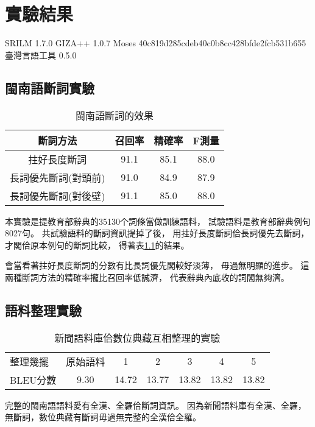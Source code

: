 
\chapter{實驗結果}
\label{章：實驗結果}
SRILM 1.7.0
GIZA++ 1.0.7
Moses 40c819d285cdeb40c0b8cc428bfde2fcb531b655
臺灣言語工具 0.5.0


\section{閩南語斷詞實驗}
\label{節：閩南語斷詞實驗}

\begin{table}
\caption{閩南語斷詞的效果}
\label{表：閩南語斷詞的效果}
\centering
\begin{tabular}{c|ccc}
斷詞方法 & 召回率 & 精確率 & F測量\\
\hline
拄好長度斷詞 & 91.1 & 85.1 & 88.0\\
長詞優先斷詞(對頭前) & 91.0 & 84.9 & 87.9\\
長詞優先斷詞(對後壁) & 91.1 & 85.0 & 88.0\\
\end{tabular}
\end{table}

本實驗是提教育部辭典的35130个詞條當做訓練語料，
試驗語料是教育部辭典例句8027句。
共試驗語料的斷詞資訊提掉了後，
用拄好長度斷詞佮長詞優先去斷詞，
才閣佮原本例句的斷詞比較，
得著表\ref{表：閩南語斷詞的效果}的結果。

會當看著拄好長度斷詞的分數有比長詞優先閣較好淡薄，
毋過無明顯的進步。
這兩種斷詞方法的精確率攏比召回率低誠濟，
代表辭典內底收的詞閣無夠濟。

\section{語料整理實驗}
\label{節：語料整理實驗}

\begin{table}
\caption{新聞語料庫佮數位典藏互相整理的實驗}
\label{表：互相整理實驗}
\centering
\begin{tabular}{lcccccc}
整理幾擺 & 原始語料 & 1 & 2 & 3 & 4 & 5\\
BLEU分數 & 9.30 & 14.72 & 13.77 & 13.82 & 13.82 & 13.82\\
\end{tabular}
\end{table}

完整的閩南語語料愛有全漢、全羅佮斷詞資訊。
因為新聞語料庫有全漢、全羅，無斷詞，數位典藏有斷詞毋過無完整的全漢佮全羅。

